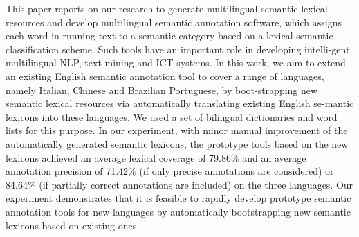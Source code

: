This paper reports on our research to generate multilingual semantic lexical resources and develop multilingual semantic annotation software, which assigns each word in running text to a semantic category based on a lexical semantic classification scheme. Such tools have an important role in developing intelli-gent multilingual NLP, text mining and ICT systems. In this work, we aim to extend an existing English semantic annotation tool to cover a range of languages, namely Italian, Chinese and Brazilian Portuguese, by boot-strapping new semantic lexical resources via automatically translating existing English se-mantic lexicons into these languages. We used a set of bilingual dictionaries and word lists for this purpose. In our experiment, with minor manual improvement of the automatically generated semantic lexicons, the prototype tools based on the new lexicons achieved an average lexical coverage of 79.86\% and an average annotation precision of 71.42\% (if only precise annotations are considered) or 84.64\% (if partially correct annotations are included) on the three languages. Our experiment demonstrates that it is feasible to rapidly develop prototype semantic annotation tools for new languages by automatically bootstrapping new semantic lexicons based on existing ones.
